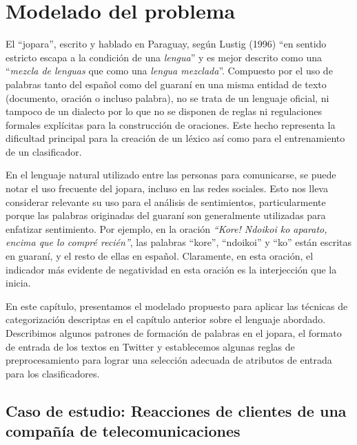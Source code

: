 \chapter{Modelado del problema}\label{formulacion}

El ``jopara'', escrito y hablado en Paraguay, seg\'un Lustig (1996) ``en sentido estricto escapa a la condici\'on de una \textit{lengua}'' y es mejor descrito como una ``\textit{mezcla de lenguas} que como una \textit{lengua mezclada}''. Compuesto por el uso de palabras tanto del espa\~nol como del guaran\'i en una misma entidad de texto (documento, oraci\'on o incluso palabra), no se trata de un lenguaje oficial, ni tampoco de un dialecto por lo que no se disponen de reglas ni regulaciones formales expl\'icitas para la construcci\'on de oraciones. Este hecho representa la dificultad principal para la creaci\'on de un l\'exico as\'i como para el entrenamiento de un clasificador.
\newline

En el lenguaje natural utilizado entre las personas para comunicarse, se puede notar el uso frecuente del jopara, incluso en las redes sociales. Esto nos lleva considerar relevante su uso para el an\'alisis de sentimientos, particularmente porque las palabras originadas del guaran\'i son generalmente utilizadas para enfatizar sentimiento. Por ejemplo, en la oraci\'on \textit{``Kore! Ndoikoi ko aparato, encima que lo compr\'e reci\'en''}, las palabras ``kore'', ``ndoikoi'' y ``ko'' est\'an escritas en guaran\'i, y el resto de ellas en espa\~nol. Claramente, en esta oraci\'on, el indicador m\'as evidente de negatividad en esta oraci\'on es la interjecci\'on que la inicia.
\newline

En este cap\'itulo, presentamos el modelado propuesto para aplicar las t\'ecnicas de categorizaci\'on descriptas en el cap\'itulo anterior sobre el lenguaje abordado. Describimos algunos patrones de formaci\'on de palabras en el jopara, el formato de entrada de los textos en Twitter y establecemos algunas reglas de preprocesamiento para lograr una selecci\'on adecuada de atributos de entrada para los clasificadores.
\newline \newline

\section{Caso de estudio: Reacciones de clientes de una compa\~n\'ia de telecomunicaciones}

